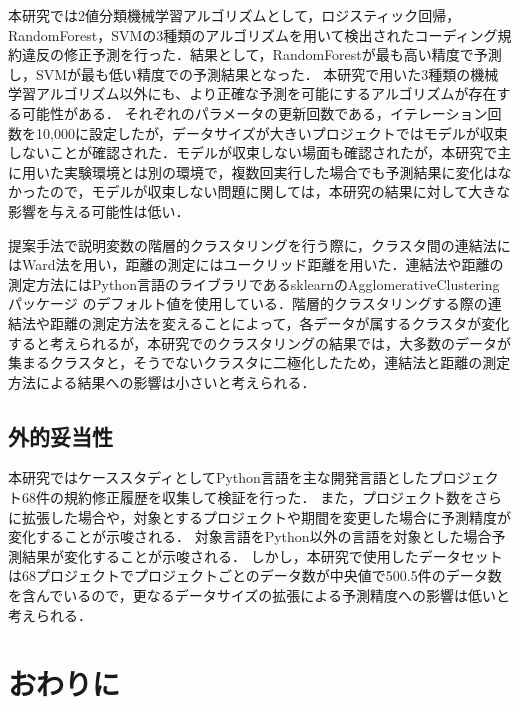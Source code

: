 \documentclass[submit,noauthor,dvipdfmx]{ipsj}
\begin{document}
本研究では2値分類機械学習アルゴリズムとして，ロジスティック回帰，RandomForest，SVMの3種類のアルゴリズムを用いて検出されたコーディング規約違反の修正予測を行った．結果として，RandomForestが最も高い精度で予測し，SVMが最も低い精度での予測結果となった．
本研究で用いた3種類の機械学習アルゴリズム以外にも、より正確な予測を可能にするアルゴリズムが存在する可能性がある．
それぞれのパラメータの更新回数である，イテレーション回数を10,000に設定したが，データサイズが大きいプロジェクトではモデルが収束しないことが確認された．モデルが収束しない場面も確認されたが，本研究で主に用いた実験環境とは別の環境で，複数回実行した場合でも予測結果に変化はなかったので，モデルが収束しない問題に関しては，本研究の結果に対して大きな影響を与える可能性は低い．

提案手法で説明変数の階層的クラスタリングを行う際に，クラスタ間の連結法にはWard法を用い，距離の測定にはユークリッド距離を用いた．連結法や距離の測定方法にはPython言語のライブラリであるsklearnのAgglomerativeClusteringパッケージ
のデフォルト値を使用している．階層的クラスタリングする際の連結法や距離の測定方法を変えることによって，各データが属するクラスタが変化すると考えられるが，本研究でのクラスタリングの結果では，大多数のデータが集まるクラスタと，そうでないクラスタに二極化したため，連結法と距離の測定方法による結果への影響は小さいと考えられる．

\subsection{外的妥当性}

本研究ではケーススタディとしてPython言語を主な開発言語としたプロジェクト68件の規約修正履歴を収集して検証を行った．
また，プロジェクト数をさらに拡張した場合や，対象とするプロジェクトや期間を変更した場合に予測精度が変化することが示唆される．
対象言語をPython以外の言語を対象とした場合予測結果が変化することが示唆される．
しかし，本研究で使用したデータセットは68プロジェクトでプロジェクトごとのデータ数が中央値で500.5件のデータ数を含んでいるので，更なるデータサイズの拡張による予測精度への影響は低いと考えられる．


\section{おわりに}\label{chap:end}
\end{document}
